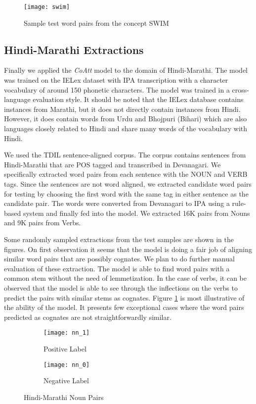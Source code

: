 \begin{figure}[t]
\centering
  \texttt{[image: swim]}
  \caption{Sample test word pairs from the concept SWIM}
  \label{disssim}
\end{figure}

\subsection{Hindi-Marathi Extractions}

Finally we applied the \textit{CoAtt} model to the domain of Hindi-Marathi. The model was trained on the IELex dataset with IPA transcription with a character vocabulary of around 150 phonetic characters. The model was trained in a cross-language evaluation style. It should be noted that the IELex database contains instances from Marathi, but it does not directly contain instances from Hindi. However, it does contain words from Urdu and Bhojpuri (Bihari) which are also languages closely related to Hindi and share many words of the vocabulary with Hindi.

We used the TDIL sentence-aligned corpus. The corpus contains sentences from Hindi-Marathi that are POS tagged and transcribed in Devanagari. We specifically extracted word pairs from each sentence with the NOUN and VERB tags. Since the sentences are not word aligned, we extracted candidate word pairs for testing by choosing the first word with the same tag in either sentence as the candidate pair. The words were converted from Devanagari to IPA using a rule-based system and finally fed into the model. We extracted 16K pairs from Nouns and 9K pairs from Verbs.

Some randomly sampled extractions from the test samples are shown in the figures. On first observation it seems that the model is doing a fair job of aligning similar word pairs that are possibly cognates. We plan to do further manual evaluation of these extraction. The model is able to find word pairs with a common stem without the need of lemmetization. In the case of verbs, it can be observed that the model is able to see through the inflections on the verbs to predict the pairs with similar stems as cognates. Figure \ref{disssim} is most illustrative of the ability of the model. It presents few exceptional cases where the word pairs predicted as cognates are not straightforwardly similar.

\begin{figure}[ht]
\centering
\begin{subfigure}{.5\textwidth}
  \centering
  \texttt{[image: nn\_1]}
  \caption{Positive Label}
\end{subfigure}%
\begin{subfigure}{.5\textwidth}
  \centering
  \texttt{[image: nn\_0]}
  \caption{Negative Label}
\end{subfigure}
\caption{Hindi-Marathi Noun Pairs}
\end{figure}

